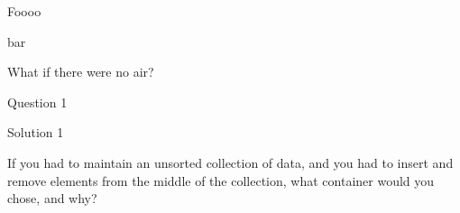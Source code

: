 \documentclass[10pt,answers,addpoints]{exam}
\begin{document}
\begin{questions}
\par\vspace{0.100000in}\begin{minipage}{\linewidth}
\question[10]

Foooo

\begin{solutionbox}{3in}

bar
\end{solutionbox}
\end{minipage}


\par\vspace{0.100000in}\begin{minipage}{\linewidth}
\question What if there were no air?
\end{minipage}


\par\vspace{0.100000in}\begin{minipage}{\linewidth}
\question[8]
Question 1
\begin{solutionbox}{0in}
Solution 1
\end{solutionbox}
\end{minipage}


\par\vspace{0.100000in}\begin{minipage}{\linewidth}
\question[10]

If you had to maintain an unsorted collection of data, and you had to insert
and remove elements from the middle of the collection, what container would
you chose, and why?


\end{minipage}
\end{questions}
\end{document}
